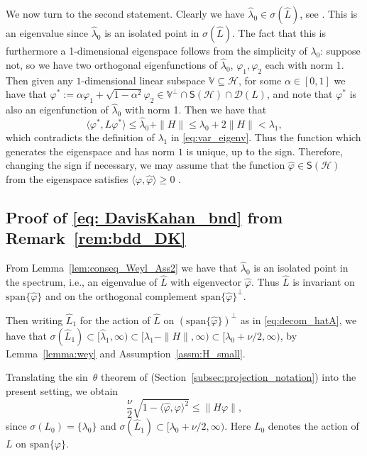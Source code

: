 \documentclass{aptpub}
\newcommand{\lspan}{\mathrm{span}}
\begin{document}
We now turn to the second statement.
Clearly we have	$\widehat\lambda_0 \in \sigma(\widehat L)$, see \cite[Theorem XIII.1]{Reed1978}. This is an eigenvalue since $\widehat\lambda_0$ is an isolated point in $\sigma(\widehat L)$. 
The fact that this is furthermore a 1-dimensional eigenspace follows from the simplicity of $\lambda_0$: suppose not, so we have two orthogonal eigenfunctions of $\widehat\lambda_0$, $\varphi_1, \varphi_2$ each with norm 1. Then given any $1$-dimensional linear subspace $\mathbb{V}\subseteq \mathcal{H}$, for some $\alpha\in [0,1]$ we have that $\varphi^*:=\alpha \varphi_1 + \sqrt{1-\alpha^2}\varphi_2 \in  \mathbb{V}^\perp\cap \mathsf{S}(\mathcal{H})\cap \mathcal{D}(L)$, and note that $\varphi^*$ is also an eigenfunction of $\widehat\lambda_0$ with norm 1. Then we have that
\begin{equation*}
    \langle \varphi^*,L\varphi^*\rangle \le \widehat\lambda_0 +\|H\|\le \lambda_0 + 2\|H\|<\lambda_1,
\end{equation*}
which contradicts the definition of $\lambda_1$ in \eqref{eq:var_eigenv}.
Thus the function which generates the eigenspace and has norm $1$ is unique, up to the sign. Therefore, changing the sign if necessary, we may assume that the function $\widehat\varphi\in \mathsf{S}(\mathcal{H})$ from the eigenspace satisfies
	$\langle \varphi , \widehat \varphi\rangle \ge 0$
	. 

\subsection{Proof of \eqref{eq: DavisKahan_bnd} from Remark~\ref{rem:bdd_DK}}
\label{sec:proof_Davis_Kahan_bnd}
From Lemma~\ref{lem:conseq_Weyl_Ass2} we have that $\widehat \lambda_0$ is an isolated point in the spectrum, i.e., an eigenvalue of $\widehat L$ with eigenvector $\widehat \varphi$. Thus $\widehat L$ is invariant on $\lspan\{\widehat \varphi\}$ and on the orthogonal complement $\lspan\{\widehat \varphi\}^\perp$.

Then writing $\widehat L_1$ for the action of $\widehat L$ on $(\lspan\{\widehat \varphi\})^\perp$ as in \eqref{eq:decom_hatA}, we have that $\sigma(\widehat L_1)\subset [\widehat \lambda_1,\infty)\subset [\lambda_1 - \|H\|,\infty)\subset [\lambda_0 + \nu/2,\infty)$, by Lemma~\ref{lemma:wey} and Assumption~\ref{assm:H_small}.

Translating the sin~$\theta$ theorem of \cite{DavisKahan1970} (Section~\ref{subsec:projection_notation}) into the present setting, we obtain 
\begin{equation*}
        \frac{\nu}{2}\sqrt{1-\langle \widehat \varphi, \varphi \rangle^2} \le \|H \varphi\|,
    \end{equation*}
since $\sigma(L_0) = \{\lambda_0\}$ and $\sigma(\widehat L_1)\subset [\lambda_0 + \nu/2,\infty)$. Here $L_0$ denotes the action of $L$ on $\lspan \{\varphi\}$.
\end{document}
